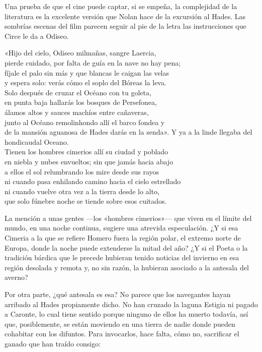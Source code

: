 \label{cap:hades}

Una prueba de que el cine puede captar, si se empeña, la complejidad de la literatura es la excelente versión que Nolan hace de la excursión al Hades. Las sombrías escenas del film parecen seguir al pie de la letra las instrucciones que Circe le da a Odiseo.

\begin{versocita}
«Hijo del cielo, Odiseo milmañas, sangre Laercia,\\
pierde cuidado, por falta de guía en la nave no hay pena;\\
fíjale el palo sin más y que blancas le caigan las velas\\
y espera solo: verás cómo el soplo del Bóreas la leva.\\
Solo después de cruzar el Océano con tu goleta,\\
en punta baja hallarás los bosques de Persefonea,\\
álamos altos y sauces machíos entre cañaveras,\\
junto al Océano remolinhondo allí el barco fondea y\\
de la mansión aguanosa de Hades darás en la senda».
\stanzabreak
Y ya a la linde llegaba del hondicaudal Oceano.\\
Tienen los hombres cimerios allí su ciudad y poblado\\
en niebla y nubes envueltos; sin que jamás hacia abajo\\
a ellos el sol relumbrando los mire desde sus rayos\\
ni cuando pasa enhilando camino hacia el cielo estrellado\\
ni cuando vuelve otra vez a la tierra desde lo alto,\\
que solo fúnebre noche se tiende sobre esos cuitados.
\end{versocita}

La mención a unas gentes ---los «hombres cimerios»--- que viven en el límite del mundo, en una noche continua, sugiere una atrevida especulación. ¿Y si esa Cimeria a la que se refiere Homero fuera la región polar, el extremo norte de Europa, donde la noche puede extenderse la mitad del año? ¿Y si el Poeta o la tradición bárdica que le precede hubieran tenido noticias del invierno en esa región desolada y remota y, no sin razón, la hubieran asociado a la antesala del averno?

Por otra parte, ¿qué antesala es esa? No parece que los navegantes hayan arribado al Hades propiamente dicho. No han cruzado la laguna Estigia ni pagado a Caronte, lo cual tiene sentido porque ninguno de ellos ha muerto todavía, así que, posiblemente, se están moviendo en una tierra de nadie donde pueden cohabitar con los difuntos. Para invocarlos, hace falta, cómo no, sacrificar el ganado que han traído consigo:

